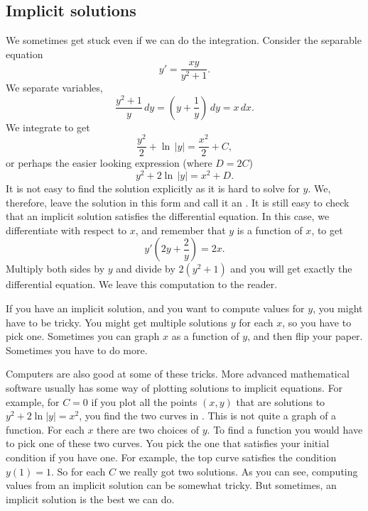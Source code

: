 \subsection{Implicit solutions}

We sometimes get stuck even if we can do the
integration.  Consider the separable equation
\begin{equation*}
y' = \frac{xy}{y^2+1} .
\end{equation*}
We separate variables,
\begin{equation*}
\frac{y^2+1}{y}\,dy = \left(y+\frac{1}{y}\right)\,dy = x\,dx .
\end{equation*}
We integrate to get
\begin{equation*}
\frac{y^2}{2} + \ln \, \lvert y \rvert = \frac{x^2}{2} + C ,
\end{equation*}
or perhaps the easier looking expression (where $D = 2C$)
\begin{equation*}
y^2 + 2 \ln \, \lvert y\rvert = x^2 + D .
\end{equation*}
It is not easy to find the solution explicitly as it is hard to solve
for $y$.  We, therefore, leave the solution in this form and call
it an
\emph{}.
It is still
easy to check that an implicit solution satisfies the differential
equation.  In this case, we differentiate with respect to $x$, and remember
that $y$ is a function of $x$,
to get
\begin{equation*}
y'\left(2y + \frac{2}{y}\right) = 2x .
\end{equation*}
Multiply both sides by $y$ and divide by $2(y^2+1)$ and you will
get exactly the differential equation.  We leave this computation to the
reader.

If you have an implicit solution, and
you want to compute values
for $y$, you might have to be tricky.  You might get multiple solutions $y$
for each $x$, so you have to pick one.  Sometimes you can
graph $x$ as a function of $y$, and then flip your paper.
Sometimes you have to do more.

Computers are also good at some of these tricks.
More advanced mathematical software usually has some
way of plotting solutions to implicit equations.
For example, for $C=0$ if you plot all the points $(x,y)$ that
are solutions to $y^2+2\ln|y|=x^2$,
you find the two curves in .  This is not quite
a graph of a function. For each $x$ there are two choices of $y$.
To find a function you would have to pick one of these two curves.
You pick the one that satisfies your initial condition if you have one.
For example, the top curve satisfies the condition $y(1)=1$.
So for each $C$ we really got two solutions.
As you can see, computing values from an implicit solution can be somewhat
tricky.  But sometimes, an implicit solution is the best we can do.

